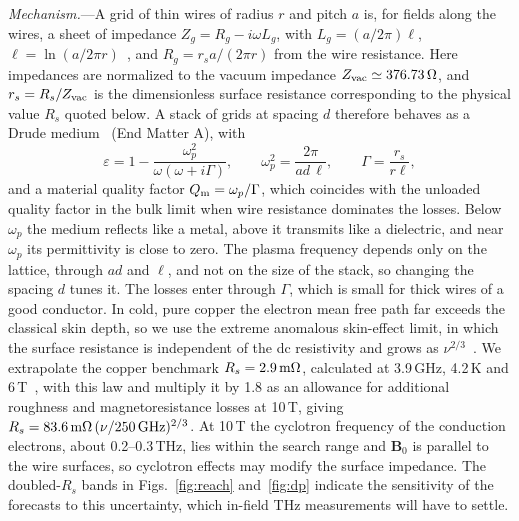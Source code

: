 \documentclass[
  aps,prl,reprint,superscriptaddress,
  amsmath,amssymb,floatfix,nofootinbib
]{revtex4-2}
\newcommand{\Qm}{Q_{\rm m}}
\begin{document}
\textit{Mechanism.}---A grid of thin wires of radius $r$ and pitch $a$ is, for fields along the wires, a sheet of impedance $Z_g=R_g-i\omega L_g$, with $L_g=(a/2\pi)\ell$, $\ell=\ln(a/2\pi r)$~\cite{Marcuvitz:1951,Belov:2003}, and $R_g=r_sa/(2\pi r)$ from the wire resistance. Here impedances are normalized to the vacuum impedance $Z_{\rm vac}\simeq376.73\,\Omega$, and $r_s=R_s/Z_{\rm vac}$ is the dimensionless surface resistance corresponding to the physical value $R_s$ quoted below. A stack of grids at spacing $d$ therefore behaves as a Drude medium~\cite{Pendry:1996} (End Matter A), with
\begin{equation}
\varepsilon=1-\frac{\omega_p^2}{\omega(\omega+i\Gamma)},\qquad \omega_p^2=\frac{2\pi}{ad\,\ell},\qquad \Gamma=\frac{r_s}{r\ell},
\label{eq:plasma}
\end{equation}
and a material quality factor $\Qm=\omega_p/\Gamma$,
which coincides with the unloaded quality factor in the
bulk limit when wire resistance dominates the losses. Below $\omega_p$ the medium reflects like a metal, above it transmits like a dielectric, and near $\omega_p$ its permittivity is close to zero. The plasma frequency depends only on the lattice, through $ad$ and $\ell$, and not on the size of the stack, so changing the spacing $d$ tunes it. The losses enter through $\Gamma$, which is small for thick wires of a good conductor. In cold, pure copper the electron mean free path far exceeds the classical skin depth, so we use the extreme anomalous skin-effect limit, in which the surface resistance is independent of the dc resistivity and grows as $\nu^{2/3}$~\cite{ReuterSondheimer:1948}. We extrapolate the copper benchmark $R_s=2.9\,{\rm m}\Omega$, calculated at 3.9\,GHz, 4.2\,K and 6\,T~\cite{Posen:2022tbs,Calatroni:2020ase}, with this law and multiply it by 1.8 as an allowance for additional roughness and magnetoresistance losses at 10\,T, giving $R_s=83.6\,{\rm m}\Omega\,(\nu/250\,{\rm GHz})^{2/3}$. At 10\,T the cyclotron frequency of the conduction electrons, about 0.2--0.3\,THz, lies within the search range and $\mathbf B_0$ is parallel to the wire surfaces, so cyclotron effects may modify the surface impedance. The doubled-$R_s$ bands in Figs.~\ref{fig:reach} and~\ref{fig:dp} indicate the sensitivity of the forecasts to this uncertainty, which in-field THz measurements will have to settle.
\end{document}
